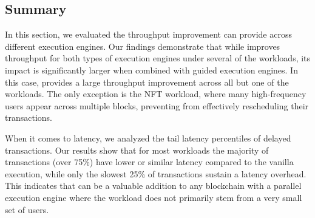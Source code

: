 \subsection{Summary}

In this section, we evaluated the throughput improvement \sys can provide across different execution engines. Our findings demonstrate that while \sys improves throughput for both types of execution engines under several of the workloads, its impact is significantly larger when combined with guided execution engines. In this case, \sys provides a large throughput improvement across all but one of the workloads. The only exception is the NFT workload, where many high-frequency users appear across multiple blocks, preventing \sys from effectively rescheduling their transactions.

When it comes to latency, we analyzed the tail latency percentiles of delayed transactions. Our results show that for most workloads the majority of transactions (over 75\%) have lower or similar latency compared to the vanilla execution, while only the slowest 25\% of transactions sustain a latency overhead.
This indicates that \sys can be a valuable addition to any blockchain with a parallel execution engine where the workload does not primarily stem from a very small set of users.
